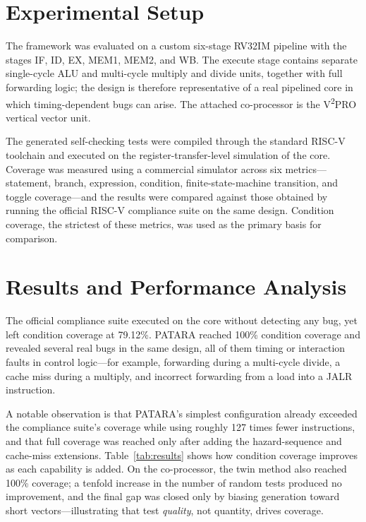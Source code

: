 \documentclass[12pt,a4paper]{report}
\begin{document}
\section{Experimental Setup}
The framework was evaluated on a custom six-stage RV32IM pipeline with the stages IF, ID,
EX, MEM1, MEM2, and WB. The execute stage contains separate single-cycle ALU and
multi-cycle multiply and divide units, together with full forwarding logic; the design is
therefore representative of a real pipelined core in which timing-dependent bugs can arise.
The attached co-processor is the V\textsuperscript{2}PRO vertical vector unit.

The generated self-checking tests were compiled through the standard RISC-V toolchain and
executed on the register-transfer-level simulation of the core. Coverage was measured using
a commercial simulator across six metrics---statement, branch, expression, condition,
finite-state-machine transition, and toggle coverage---and the results were compared against
those obtained by running the official RISC-V compliance suite on the same design. Condition
coverage, the strictest of these metrics, was used as the primary basis for comparison.

\section{Results and Performance Analysis}
The official compliance suite executed on the core without detecting any bug, yet left
condition coverage at 79.12\%. PATARA reached 100\% condition coverage and revealed several
real bugs in the same design, all of them timing or interaction faults in control
logic---for example, forwarding during a multi-cycle divide, a cache miss during a multiply,
and incorrect forwarding from a load into a JALR instruction.

A notable observation is that PATARA's simplest configuration already exceeded the
compliance suite's coverage while using roughly 127 times fewer instructions, and that full
coverage was reached only after adding the hazard-sequence and cache-miss extensions.
Table~\ref{tab:results} shows how condition coverage improves as each capability is added.
On the co-processor, the twin method also reached 100\% coverage; a tenfold increase in the
number of random tests produced no improvement, and the final gap was closed only by biasing
generation toward short vectors---illustrating that test \emph{quality}, not quantity, drives
coverage.
\end{document}
